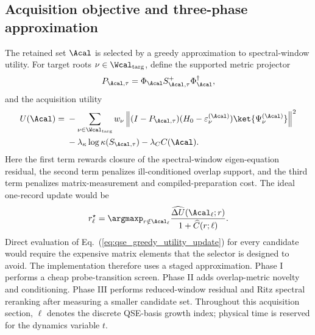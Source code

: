 
\subsection{Acquisition objective and three-phase approximation}
\label{sec:acquisition_objective}

The retained set \(\Acal\) is selected by a greedy approximation to spectral-window utility.  For target roots \(\nu\in\Wcal_{\rm targ}\), define the supported metric projector
\begin{equation}
P_{\Acal,\tau}=\Phi_\Acal S_{\Acal,\tau}^+\Phi_\Acal^\dagger,
\label{eq:qse_supported_projector_objective}
\end{equation}
and the acquisition utility
\begin{equation}
\begin{aligned}
U(\Acal)
={}&-
\sum_{\nu\in\Wcal_{\rm targ}}
w_\nu
\left\|
(I-P_{\Acal,\tau})(H_0-\varepsilon_\nu^{(\Acal)})
\ket{\Psi_\nu^{(\Acal)}}
\right\|^2
\\
&-\lambda_\kappa\log\kappa(S_{\Acal,\tau})
-\lambda_C C(\Acal).
\end{aligned}
\label{eq:qse_acquisition_utility}
\end{equation}
Here the first term rewards closure of the spectral-window eigen-equation residual, the second term penalizes ill-conditioned overlap support, and the third term penalizes matrix-measurement and compiled-preparation cost.  The ideal one-record update would be
\begin{equation}
r_\ell^\star
=
\argmaxp_{r\notin\Acal_\ell}
\frac{
\widehat{\Delta U}(\Acal_\ell;r)
}{
1+\widehat C(r;\ell)
}.
\label{eq:qse_greedy_utility_update}
\end{equation}
Direct evaluation of Eq.~(\ref{eq:qse_greedy_utility_update}) for every candidate would require the expensive matrix elements that the selector is designed to avoid.  The implementation therefore uses a staged approximation.  Phase I performs a cheap probe-transition screen.  Phase II adds overlap-metric novelty and conditioning.  Phase III performs reduced-window residual and Ritz spectral reranking after measuring a smaller candidate set.  Throughout this acquisition section, \(\ell\) denotes the discrete QSE-basis growth index; physical time is reserved for the dynamics variable \(t\).

